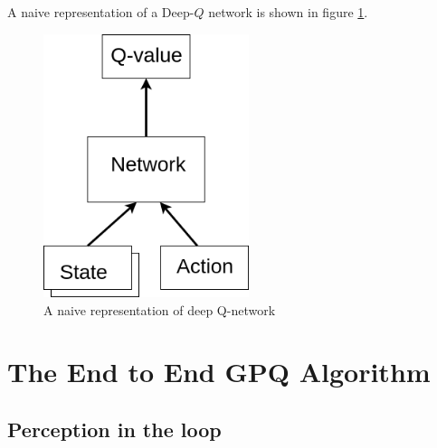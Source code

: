 \documentclass[12pt]{report}
\begin{document}
A naive representation of a Deep-$Q$ network is shown in figure \ref{fig:deep_q}.
\begin{figure}[H]
	\centering
	\includegraphics[width=6cm]{deep_q.png}
	\caption {A naive representation of deep Q-network}
   \label{fig:deep_q}
\end{figure}

\chapter{The End to End GPQ Algorithm} %

\label{gpq} %
\section{Perception in the loop}
 
\end{document}

